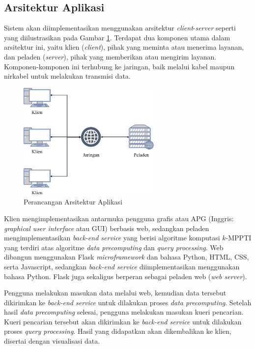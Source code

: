 \subsection{Arsitektur Aplikasi} 
\tab Sistem akan diimplementasikan menggunakan arsitektur \textit{client}-\textit{server} seperti yang diilustrasikan pada Gambar \ref{fig:arsitektur}. Terdapat dua komponen utama dalam arsitektur ini, yaitu klien (\textit{client}), pihak yang meminta atau menerima layanan, dan peladen (\textit{server}), pihak yang memberikan atau mengirim layanan. Komponen-komponen ini terhubung ke jaringan, baik melalui kabel maupun nirkabel untuk melakukan transmisi data. 

\begin{figure}[h]
	\centering
	\includegraphics[width=7cm]{assets/img/bab3/arsitektur.png}
	\caption{Perancangan Arsitektur Aplikasi}
	\label{fig:arsitektur}
\end{figure}

Klien mengimplementasikan antarmuka pengguna grafis atau APG (Inggris: \textit{graphical user interface} atau GUI) berbasis web, sedangkan peladen mengimplementasikan \textit{back-end service} yang berisi algoritme komputasi $k$-MPPTI yang terdiri atas algoritme \textit{data precomputing} dan \textit{query processing}. Web dibangun menggunakan Flask \textit{microframework} dan bahasa Python, HTML, CSS, serta Javascript, sedangkan \textit{back-end service} diimplementasikan menggunakan bahasa Python. Flask juga sekaligus berperan sebagai peladen web (\textit{web server}).

Pengguna melakukan masukan data melalui web, kemudian data tersebut dikirimkan ke \textit{back-end service} untuk dilakukan proses \textit{data precomputing}. Setelah hasil \textit{data precomputing} selesai, pengguna melakukan masukan kueri pencarian. Kueri pencarian tersebut akan dikirimkan ke \textit{back-end service} untuk dilakukan proses \textit{query processing}. Hasil yang didapatkan akan dikembalikan ke klien, disertai dengan visualisasi data.
